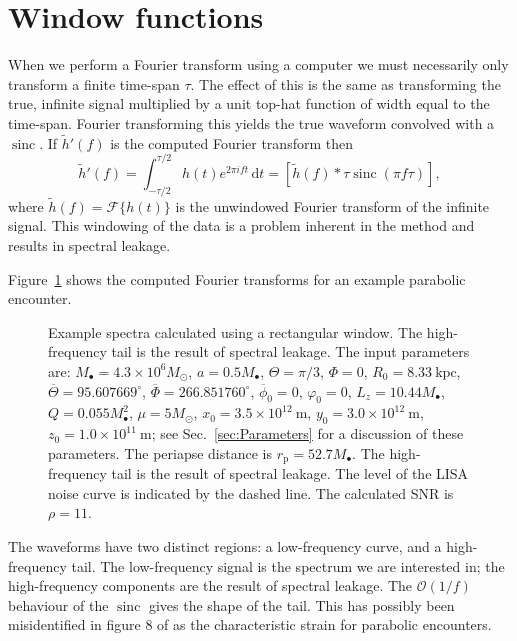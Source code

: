 \documentclass[useAMS,usedcolumn,usegraphicx,usenatbib]{mn2e}
\newcommand{\Figref}[1]{Figure~\ref{fig:#1}}
\newcommand{\secref}[1]{Sec.~\ref{sec:#1}}
\newcommand{\units}[1]{\ensuremath{~\mathrm{#1}}}
\DeclareMathOperator{\sinc}{sinc}
\newcommand{\sub}[1]{\ensuremath{_\mathrm{#1}}}
\newcommand{\dd}{\ensuremath{\mathrm{d}}}
\newcommand{\intd}[4]{\ensuremath{\int_{#1}^{#2}{#3}\,\dd{#4}}}
\newcommand{\order}[1]{\ensuremath{\mathcal{O}({#1})}}
\begin{document}



\appendix

\section{Window functions}\label{ap:window}

When we perform a Fourier transform using a computer we must necessarily only transform a finite time-span $\tau$. The effect of this is the same as transforming the true, infinite signal multiplied by a unit top-hat function of width equal to the time-span. Fourier transforming this yields the true waveform convolved with a $\sinc$. If $\tilde{h}'(f)$ is the computed Fourier transform then
\begin{equation}
\tilde{h}'(f) = \intd{-\tau/2}{\tau/2}{h(t)e^{2\pi i ft}}{t} = \left[\tilde{h}(f) \ast \tau \sinc(\pi f\tau)\right],
\end{equation}
where $\tilde{h}(f) = \mathscr{F}\{h(t)\}$ is the unwindowed Fourier transform of the infinite signal. This windowing of the data is a problem inherent in the method and results in spectral leakage.

\Figref{Rectangular} shows the computed Fourier transforms for an example parabolic encounter.
\begin{figure}[htbp]
  \begin{center} 
    \caption{Example spectra calculated using a rectangular window.  The high-frequency tail is the result of spectral leakage. The input parameters are: $M_\bullet = 4.3 \times 10^6 M_\odot$, $a = 0.5 M_\bullet$, $\Theta = \pi/3$, $\Phi = 0$, $R_0 = 8.33\units{kpc}$, $\overline{\Theta} = {95.607669}^{\circ}$, $\overline{\Phi} = {266.851760}^{\circ}$, $\overline{\phi}_0 = 0$, $\varphi_0 = 0$, $L_z = 10.44 M_\bullet$, $Q = 0.055 M_\bullet^2$, $\mu = 5 M_\odot$, $x_0 = 3.5 \times 10^{12}\units{m}$, $y_0 = 3.0 \times 10^{12}\units{m}$, $z_0 = 1.0 \times 10^{11}\units{m}$; see \secref{Parameters} for a discussion of these parameters. The periapse distance is $r\sub{p} = 52.7 M_\bullet$. The high-frequency tail is the result of spectral leakage. The level of the LISA noise curve is indicated by the dashed line. The calculated SNR is $\rho = 11$.}
    \label{fig:Rectangular}
  \end{center}
\end{figure}
The waveforms have two distinct regions: a low-frequency curve, and a high-frequency tail. The low-frequency signal is the spectrum we are interested in; the high-frequency components are the result of spectral leakage. The $\order{1/{f}}$ behaviour of the $\sinc$ gives the shape of the tail. This has possibly been misidentified in figure 8 of \citet{Burko2007} as the characteristic strain for parabolic encounters.
\end{document}
